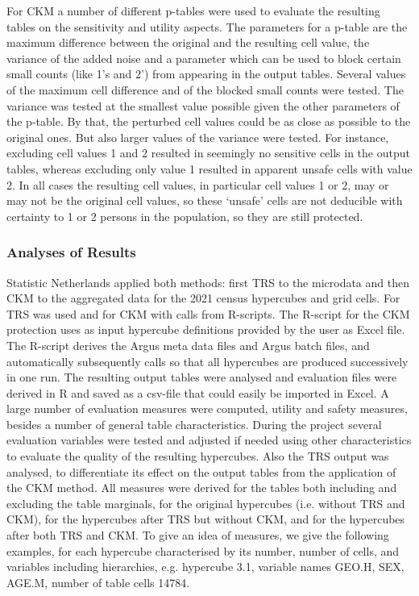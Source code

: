 For CKM a number of different p-tables were used to evaluate the resulting tables on the sensitivity and utility aspects. The parameters for a p-table are the maximum difference between the original and the resulting cell value, the variance of the added noise and a parameter which can be used to block certain small counts (like 1's and 2') from appearing in the output tables. Several values of the maximum cell difference and of the blocked small counts were tested. The variance was tested at the smallest value possible given the other parameters of the p-table. By that, the perturbed cell values could be as close as possible to the original ones. But also larger values of the variance were tested. For instance, excluding cell values 1 and 2 resulted in seemingly no sensitive cells in the output tables, whereas excluding only value 1 resulted in apparent unsafe cells with value 2. In all cases the resulting cell values, in particular cell values 1 or 2, may or may not be the original cell values, so these `unsafe' cells are not deducible with certainty to 1 or 2 persons in the population, so they are still protected.

\subsubsection{Analyses of Results}
Statistic Netherlands applied both methods: first TRS to the microdata and then CKM to the aggregated data for the 2021 census hypercubes and grid cells. For TRS \margus was used and for CKM \targus with calls from R-scripts. The R-script for the CKM protection uses as input hypercube definitions provided by the user as Excel file. The R-script derives the Argus meta data files and Argus batch files, and automatically subsequently calls \targus so that all hypercubes are produced successively in one run. The resulting output tables were analysed and evaluation files were derived in R and saved as a csv-file that could easily be imported in Excel. A large number of evaluation measures were computed, utility and safety measures, besides a number of general table characteristics. During the project several evaluation variables were tested and adjusted if needed using other characteristics to evaluate the quality of the resulting hypercubes. Also the TRS output was analysed, to differentiate its effect on the output tables from the application of the CKM method. All measures were derived for the tables both including and excluding the table marginals, for the original hypercubes (i.e. without TRS and CKM), for the hypercubes after TRS but without CKM, and for the hypercubes after both TRS and CKM. To give an idea of measures, we give the following examples, for each hypercube characterised by its number, number of cells, and variables including hierarchies, e.g. hypercube 3.1, variable names GEO.H, SEX, AGE.M, number of table cells 14784. 

